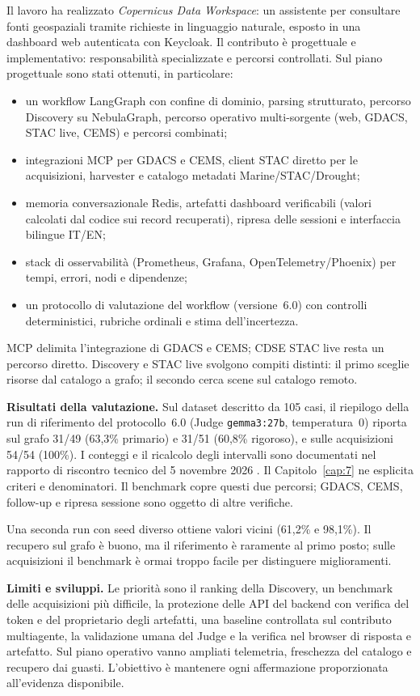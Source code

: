 Il lavoro ha realizzato \emph{Copernicus Data Workspace}: un assistente per
consultare fonti geospaziali tramite richieste in linguaggio naturale, esposto
in una dashboard web autenticata con Keycloak. Il contributo è progettuale e
implementativo: responsabilità specializzate e percorsi controllati. Sul piano
progettuale sono stati ottenuti, in particolare:

\begin{itemize}
    \item un workflow LangGraph con confine di dominio, parsing strutturato,
    percorso Discovery su NebulaGraph, percorso operativo multi-sorgente
    (web, GDACS, STAC live, CEMS) e percorsi combinati;
    \item integrazioni MCP per GDACS e CEMS, client STAC diretto per le
    acquisizioni, harvester e catalogo metadati Marine/STAC/Drought;
    \item memoria conversazionale Redis, artefatti dashboard verificabili
    (valori calcolati dal codice sui record recuperati), ripresa delle
    sessioni e interfaccia bilingue IT/EN;
    \item stack di osservabilità (Prometheus, Grafana, OpenTelemetry/Phoenix)
    per tempi, errori, nodi e dipendenze;
    \item un protocollo di valutazione del workflow
    (versione~6.0) con controlli deterministici, rubriche ordinali e stima
    dell'incertezza.
\end{itemize}

MCP delimita l'integrazione di GDACS e CEMS; CDSE STAC live resta un percorso
diretto. Discovery e STAC live svolgono compiti distinti: il primo sceglie
risorse dal catalogo a grafo; il secondo cerca scene sul catalogo remoto.

\textbf{Risultati della valutazione.}
Sul dataset descritto da 105 casi, il riepilogo della run di riferimento del
protocollo~6.0 (Judge \texttt{gemma3:27b}, temperatura~0) riporta
sul grafo 31/49 (63,3\% primario) e 31/51 (60,8\% rigoroso), e sulle
acquisizioni 54/54 (100\%). I conteggi e il ricalcolo degli intervalli sono documentati nel rapporto di
riscontro tecnico del 5 novembre 2026 \cite{riscontroTecnico2026}.
Il Capitolo~\ref{cap:7} ne esplicita criteri e denominatori.
Il benchmark copre questi due percorsi; GDACS, CEMS, follow-up e ripresa
sessione sono oggetto di altre verifiche.

Una seconda run con seed diverso ottiene valori vicini (61,2\% e 98,1\%).
Il recupero sul grafo è buono, ma il riferimento è raramente al primo posto;
sulle acquisizioni il benchmark è ormai troppo facile per distinguere
miglioramenti.

\textbf{Limiti e sviluppi.}
Le priorità sono il ranking della Discovery, un benchmark delle acquisizioni
più difficile, la protezione delle API del backend con verifica del token e
del proprietario degli artefatti, una baseline controllata sul contributo
multiagente, la validazione umana del Judge e la verifica nel browser di
risposta e artefatto. Sul piano operativo vanno ampliati
telemetria, freschezza del catalogo e recupero dai guasti. L'obiettivo è
mantenere ogni affermazione proporzionata all'evidenza disponibile.
